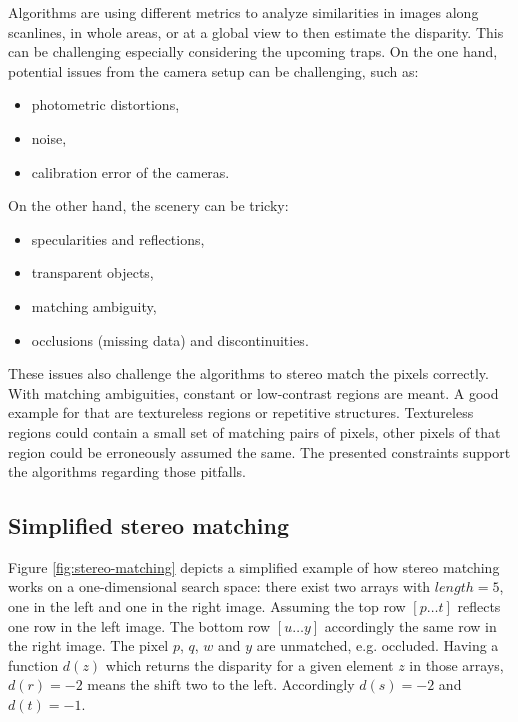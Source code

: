 Algorithms are using different metrics to analyze similarities in images along scanlines, in whole areas, or at a global view to then estimate the disparity.
This can be challenging especially considering the upcoming traps.
On the one hand, potential issues from the camera setup can be challenging, such as:

\begin{itemize}
  \item photometric distortions,
  \item noise,
  \item calibration error of the cameras.
\end{itemize}

\noindent On the other hand, the scenery can be tricky:

\begin{itemize}
  \item specularities and reflections,
  \item transparent objects,
  \item matching ambiguity,
  \item occlusions (missing data) and discontinuities.
\end{itemize}

\noindent These issues also challenge the algorithms to stereo match the pixels correctly.
With matching ambiguities, constant or low-contrast regions are meant.
A good example for that are textureless regions or repetitive structures.
Textureless regions could contain a small set of matching pairs of pixels, other pixels of that region could be erroneously assumed the same.
The presented constraints support the algorithms regarding those pitfalls.

\subsection*{Simplified stereo matching}

Figure \ref{fig:stereo-matching} depicts a simplified example of how stereo matching works on a one-dimensional search space:
there exist two arrays with $length = 5$, one in the left and one in the right image.
Assuming the top row $[p \dots t]$ reflects one row in the left image.
The bottom row $[u \dots y]$ accordingly the same row in the right image.
The pixel $p$, $q$, $w$ and $y$ are unmatched, e.g. occluded.
Having a function $d(z)$ which returns the disparity for a given element $z$ in those arrays, $d(r) = -2$ means the shift two to the left.
Accordingly $d(s) = -2$ and $d(t) = -1$.


